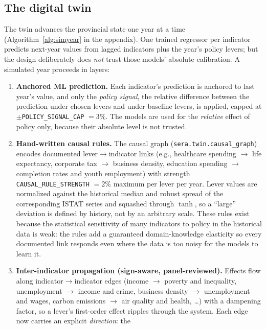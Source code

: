 \documentclass[11pt,a4paper]{article}
\newcommand{\code}[1]{\texttt{#1}}
\begin{document}
\subsection{The digital twin}
\label{sec:twin}

The twin advances the provincial state one year at a time
(Algorithm~\ref{alg:simyear} in the appendix). One trained regressor per
indicator predicts next-year values from lagged indicators plus the year's
policy levers; but the design deliberately does \emph{not} trust those models'
absolute calibration. A simulated year proceeds in layers:

\begin{enumerate}
    \item \textbf{Anchored ML prediction.} Each indicator's prediction is
    anchored to last year's value, and only the \emph{policy signal}, the
    relative difference between the prediction under chosen levers and under
    baseline levers, is applied, capped at
    $\pm$\code{POLICY\_SIGNAL\_CAP} $= 3\%$. The models are used for the
    \emph{relative} effect of policy only, because their absolute level is not
    trusted.
    \item \textbf{Hand-written causal rules.} The causal graph
    (\code{sera.twin.causal\_graph}) encodes documented lever$\to$indicator
    links (e.g., healthcare spending $\to$ life expectancy, corporate tax $\to$
    business density, education spending $\to$ completion rates and youth
    employment) with strength \code{CAUSAL\_RULE\_STRENGTH} $= 2\%$ maximum per
    lever per year. Lever values are normalized against the historical median
    and robust spread of the corresponding ISTAT series and squashed through
    $\tanh$, so a ``large'' deviation is defined by history, not by an
    arbitrary scale. These rules exist because the statistical sensitivity of
    many indicators to policy in the historical data is weak: the rules add a
    guaranteed domain-knowledge elasticity so every documented link responds
    even where the data is too noisy for the models to learn it.
    \item \textbf{Inter-indicator propagation (sign-aware, panel-reviewed).}
    Effects flow along indicator$\to$indicator edges (income $\to$ poverty and
    inequality, unemployment $\to$ income and crime, business density $\to$
    unemployment and wages, carbon emissions $\to$ air quality and health,
    \dots) with a dampening factor, so a lever's first-order effect ripples
    through the system. Each edge now carries an explicit \emph{direction}: the

\end{enumerate}
\end{document}

